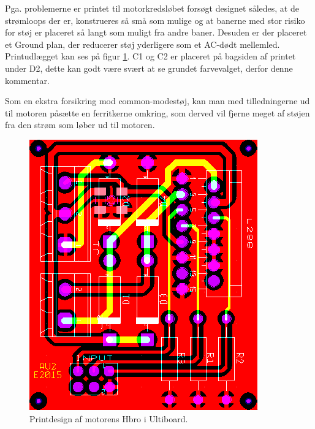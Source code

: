 Pga. problemerne er printet til motorkredsløbet forsøgt designet således, at de strømloops der er, konstrueres så små som mulige og at banerne med stor risiko for støj er placeret så langt som muligt fra andre baner. Desuden er der placeret et Ground plan, der reducerer støj yderligere som et AC-dødt mellemled. Printudlægget kan ses på figur \ref{fig:hbro_ultiboard}.
C1 og C2 er placeret på bagsiden af printet under D2, dette kan godt være svært at se grundet farvevalget, derfor denne kommentar.

Som en ekstra forsikring mod common-modestøj, kan man med tilledningerne ud til motoren påsætte en ferritkerne omkring, som derved vil fjerne meget af støjen fra den strøm som løber ud til motoren.

\begin{figure}[h]
\centering
\includegraphics[scale=1]{../fig/billeder/hbro_ultiboard.png}
\caption{Printdesign af motorens Hbro i Ultiboard.}
\label{fig:hbro_ultiboard}
\end{figure}

